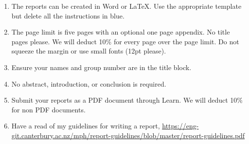 \documentclass[a4paper,12pt]{article}
\begin{document}
\begin{enumerate}
\item The reports can be created in Word or \LaTeX.  Use the
  appropriate template but delete all the instructions in blue.  

\item The page limit is five pages with an optional one page appendix.
  No title pages please.  We will deduct 10\% for every page over the
  page limit.  Do not squeeze the margin or use small fonts (12pt
  please).

\item Ensure your names and group number are in the title block.

\item No abstract, introduction, or conclusion is required.
  
\item Submit your reports as a PDF document through Learn.  We will
  deduct 10\% for non PDF documents.

\item Have a read of my guidelines for writing a report,
  \url{https://eng-git.canterbury.ac.nz/mph/report-guidelines/blob/master/report-guidelines.pdf}
  
\end{enumerate}
\end{document}
